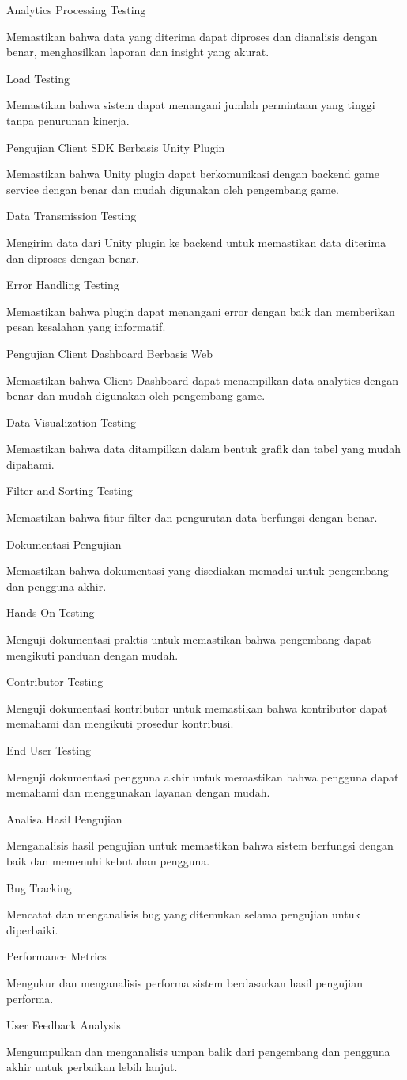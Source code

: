 Analytics Processing Testing

Memastikan bahwa data yang diterima dapat diproses dan dianalisis dengan benar, menghasilkan laporan dan insight yang akurat.

Load Testing

Memastikan bahwa sistem dapat menangani jumlah permintaan yang tinggi tanpa penurunan kinerja.

Pengujian Client SDK Berbasis Unity Plugin

Memastikan bahwa Unity plugin dapat berkomunikasi dengan backend game service dengan benar dan mudah digunakan oleh pengembang game.

Data Transmission Testing

Mengirim data dari Unity plugin ke backend untuk memastikan data diterima dan diproses dengan benar.

Error Handling Testing

Memastikan bahwa plugin dapat menangani error dengan baik dan memberikan pesan kesalahan yang informatif.

Pengujian Client Dashboard Berbasis Web

Memastikan bahwa Client Dashboard dapat menampilkan data analytics dengan benar dan mudah digunakan oleh pengembang game.

Data Visualization Testing

Memastikan bahwa data ditampilkan dalam bentuk grafik dan tabel yang mudah dipahami.

Filter and Sorting Testing

Memastikan bahwa fitur filter dan pengurutan data berfungsi dengan benar.

Dokumentasi Pengujian

Memastikan bahwa dokumentasi yang disediakan memadai untuk pengembang dan pengguna akhir.

Hands-On Testing

Menguji dokumentasi praktis untuk memastikan bahwa pengembang dapat mengikuti panduan dengan mudah.

Contributor Testing

Menguji dokumentasi kontributor untuk memastikan bahwa kontributor dapat memahami dan mengikuti prosedur kontribusi.

End User Testing

Menguji dokumentasi pengguna akhir untuk memastikan bahwa pengguna dapat memahami dan menggunakan layanan dengan mudah.

Analisa Hasil Pengujian

Menganalisis hasil pengujian untuk memastikan bahwa sistem berfungsi dengan baik dan memenuhi kebutuhan pengguna.

Bug Tracking

Mencatat dan menganalisis bug yang ditemukan selama pengujian untuk diperbaiki.

Performance Metrics

Mengukur dan menganalisis performa sistem berdasarkan hasil pengujian performa.

User Feedback Analysis

Mengumpulkan dan menganalisis umpan balik dari pengembang dan pengguna akhir untuk perbaikan lebih lanjut.
